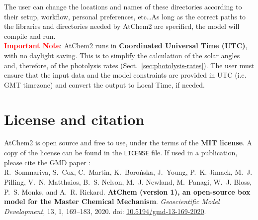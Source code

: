 The user can change the locations and names of these directories
according to their setup, workflow, personal preferences, etc\ldots As
long as the correct paths to the libraries and directories needed by
AtChem2 are specified, the model will compile and run.\\

\textcolor{red}{\bf Important Note}: AtChem2 runs in
\textbf{Coordinated Universal Time (UTC)}, with no daylight
saving. This is to simplify the calculation of the solar angles and,
therefore, of the photolysis rates (Sect.~\ref{sec:photolysis-rates}).
The user must ensure that the input data and the model constraints are
provided in UTC (i.e. GMT timezone) and convert the output to Local
Time, if needed.

\section{License and citation} \label{sec:license-citation}

AtChem2 is open source and free to use, under the terms of the
\textbf{MIT license}. A copy of the license can be found in the
\texttt{LICENSE} file. If used in a publication, please cite the GMD
paper \citep{sommariva_2020}:\\

R.~Sommariva, S.~Cox, C.~Martin, K.~Boro{\'n}ska, J.~Young, P.~K. Jimack,
M.~J. Pilling, V.~N. Matthaios, B.~S. Nelson, M.~J. Newland, M.~Panagi,
W.~J. Bloss, P.~S. Monks, and A.~R. Rickard.
\textbf{AtChem (version 1), an open-source box model for the Master Chemical Mechanism}.
\textit{Geoscientific Model Development}, 13, 1, 169--183, 2020.
doi: \href{https://doi.org/10.5194/gmd-13-169-2020}{10.5194/gmd-13-169-2020}.
